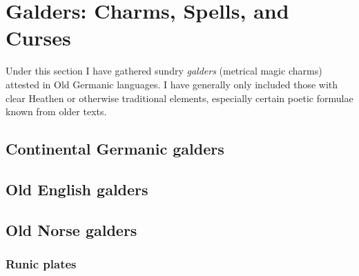 \part{Galders: Charms, Spells, and Curses}

Under this section I have gathered sundry \emph{galders} (metrical magic charms) attested in Old Germanic languages.  I have generally only included those with clear Heathen or otherwise traditional elements, especially certain poetic formulae known from older texts.


\chapter{Continental Germanic galders}






\chapter{Old English galders}










\chapter{Old Norse galders}










\section{Runic plates}
